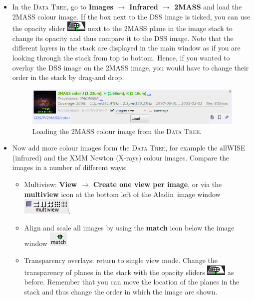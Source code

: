 \documentclass [a4paper, 12pt]{article}
\newcommand{\aladin}{{\textsc{A}{ladin}}}
\begin{document}
\begin{itemize}
    \item In the \textsc{Data Tree}, go to \textbf{Images $\rightarrow$ 
Infrared $\rightarrow$ 2MASS} and load the 2MASS colour image. If the box next 
to the DSS image is ticked, you can use the opacity slider 
\includegraphics[width=0.035  
\textwidth]{../images/aladin_button_opacity.png} next to the 2MASS plane in the 
image stack to change its opacity and thus compare it to the 
DSS image. Note that the different layers in the stack are displayed in the 
main window as if you are looking through the stack from top to bottom. Hence, 
if  you wanted to overlay the DSS image on the 2MASS image, you would have to 
change their order in the stack by drag-and drop. 

\begin{figure}[H]
    \center
    \includegraphics[width=1  
    \textwidth]{../images/aladin_load_2mass-rgb-image.png}
    \caption{Loading the 2MASS colour image from the \textsc{Data Tree}. }
    \label{fig:aladin_load_2mass}
\end{figure}

    \item Now add more colour images form the \textsc{Data Tree}, for example 
the allWISE (infrared) and the XMM Newton (X-rays) colour images. Compare the 
images in a number of different ways:
    \begin{itemize}
        \item Multiview: \textbf{View $\rightarrow$ Create one view per image}, 
        or via the \textbf{multiview} icon at the bottom left of the \aladin\ 
        image window \includegraphics[width=0.1 
        \textwidth]{../images/aladin_button_multiview.jpg}.
        \item Align and scale all images by using the \textbf{match} icon below 
        the image window \includegraphics[width=0.04  
        \textwidth]{../images/aladin_button_match-views.jpg}
        \item Transparency overlays: return to single view mode. Change the 
        transparency of planes in the stack with the opacity sliders         
        \includegraphics[width=0.04  
        \textwidth]{../images/aladin_button_opacity.png} as before. Remember  
        that you can move the location of the planes in the stack and thus 
        change the order in which the image are shown.
    \end{itemize}


\end{itemize}
\end{document}
